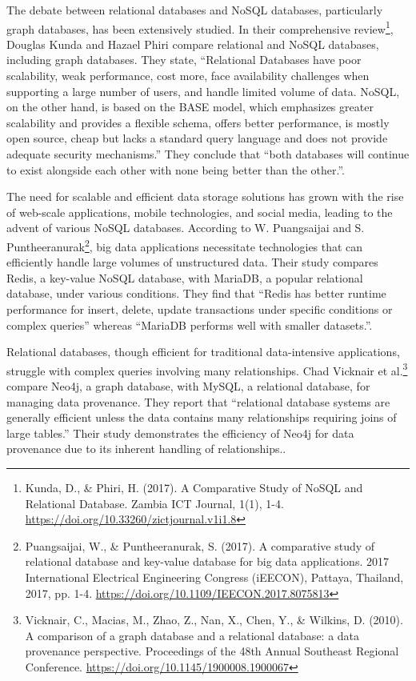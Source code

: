 
The debate between relational databases and NoSQL databases, particularly graph databases, has been extensively studied. In their comprehensive review\footnote{Kunda, D., \& Phiri, H. (2017). A Comparative Study of NoSQL and Relational Database. Zambia ICT Journal, 1(1), 1-4. \protect\url{https://doi.org/10.33260/zictjournal.v1i1.8}}, Douglas Kunda and Hazael Phiri compare relational and NoSQL databases, including graph databases. They state, “Relational Databases have poor scalability, weak performance, cost more, face availability challenges when supporting a large number of users, and handle limited volume of data. NoSQL, on the other hand, is based on the BASE model, which emphasizes greater scalability and provides a flexible schema, offers better performance, is mostly open source, cheap but lacks a standard query language and does not provide adequate security mechanisms.” They conclude that “both databases will continue to exist alongside each other with none being better than the other.”.

The need for scalable and efficient data storage solutions has grown with the rise of web-scale applications, mobile technologies, and social media, leading to the advent of various NoSQL databases. According to W. Puangsaijai and S. Puntheeranurak\footnote{Puangsaijai, W., \& Puntheeranurak, S. (2017). A comparative study of relational database and key-value database for big data applications. 2017 International Electrical Engineering Congress (iEECON), Pattaya, Thailand, 2017, pp. 1-4. \protect\url{https://doi.org/10.1109/IEECON.2017.8075813}}, big data applications necessitate technologies that can efficiently handle large volumes of unstructured data. Their study compares Redis, a key-value NoSQL database, with MariaDB, a popular relational database, under various conditions. They find that “Redis has better runtime performance for insert, delete, update transactions under specific conditions or complex queries” whereas “MariaDB performs well with smaller datasets.”.

Relational databases, though efficient for traditional data-intensive applications, struggle with complex queries involving many relationships. Chad Vicknair et al.\footnote{Vicknair, C., Macias, M., Zhao, Z., Nan, X., Chen, Y., \& Wilkins, D. (2010). A comparison of a graph database and a relational database: a data provenance perspective. Proceedings of the 48th Annual Southeast Regional Conference. \protect\url{https://doi.org/10.1145/1900008.1900067}} compare Neo4j, a graph database, with MySQL, a relational database, for managing data provenance. They report that “relational database systems are generally efficient unless the data contains many relationships requiring joins of large tables.” Their study demonstrates the efficiency of Neo4j for data provenance due to its inherent handling of relationships..

